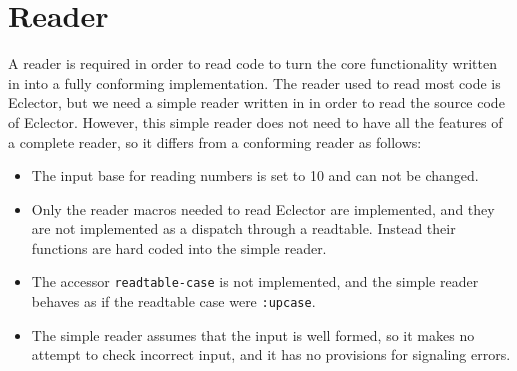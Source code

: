 \chapter{Reader}

A reader is required in order to read \commonlisp{} code to turn the
core functionality written in \clanguage{} into a fully conforming
\commonlisp{} implementation.  The reader used to read most code is
Eclector, but we need a simple reader written in \clanguage{} in order
to read the source code of Eclector.  However, this simple reader does
not need to have all the features of a complete \commonlisp{} reader,
so it differs from a conforming reader as follows:

\begin{itemize}
\item The input base for reading numbers is set to 10 and can not be
  changed.
\item Only the reader macros needed to read Eclector are implemented,
  and they are not implemented as a dispatch through a readtable.
  Instead their functions are hard coded into the simple reader.
\item The accessor \texttt{readtable-case} is not implemented, and the
  simple reader behaves as if the readtable case were
  \texttt{:upcase}.
\item The simple reader assumes that the input is well formed, so it
  makes no attempt to check incorrect input, and it has no provisions
  for signaling errors. 
\end{itemize}

